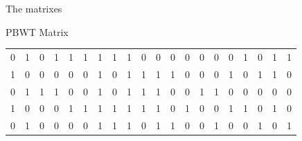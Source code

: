 \documentclass{beamer}
\begin{document}
\begin{frame}{The matrixes}
\begin{block}{PBWT Matrix}
\begin{table}[H]
\begin{tabular}{c|c|c|c|c|c|c|c|c|c|c|c|c|c|c|c|c|c|c|c}
                    0 & 1 & 0 & 1 & 1 & 1 & 1 & 1 & 1 & 0 & 0 & 0 & 0 & 0 & 0 & 0 & 1 & 0
                                                                                                                                                                                                       & 1 & 1 \\
                    1 & 0 & 0 & 0 & 0 & 0 & 1 & 0 & 1 & 1 & 1 & 1 & 0 & 0 & 0 & 1 & 0 & 1
                                                                                                                                                                                                       & 1 & 0 \\
                    0 & 1 & 1 & 1 & 0 & 0 & 1 & 0 & 1 & 1 & 1 & 0 & 0 & 1 & 1 & 0 & 0 & 0
                                                                                                                                                                                                       & 0 & 0 \\
                    1 & 0 & 0 & 0 & 1 & 1 & 1 & 1 & 1 & 1 & 1 & 0 & 1 & 0 & 0 & 1 & 1 & 0
                                                                                                                                                                                                       & 1 & 0 \\
                    0 & 1 & 0 & 0 & 0 & 0 & 1 & 1 & 1 & 0 & 1 & 1 & 0 & 0 & 1 & 0 & 0 & 1
                                                                                                                                                                                                       & 0 & 1 \\
                    \hline
                  \end{tabular}
                    \end{table}
                    \end{block}
                    \end{frame}
\end{document}
